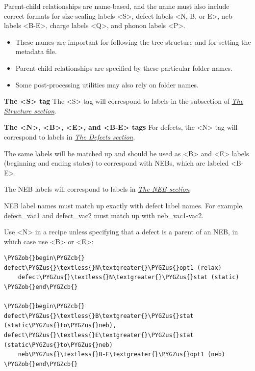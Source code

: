 \documentclass[letterpaper,10pt,english]{sphinxmanual}
\def\PYGZus{\char`\_}
\def\PYGZob{\char`\{}
\def\PYGZcb{\char`\}}
\begin{document}
Parent-child relationships are name-based, and the name must also include correct formats for size-scaling labels \textless{}S\textgreater{}, defect labels \textless{}N, B, or E\textgreater{}, neb labels \textless{}B-E\textgreater{}, charge labels \textless{}Q\textgreater{}, and phonon labels \textless{}P\textgreater{}.
\begin{itemize}
\item {} 
These names are important for following the tree structure and for setting the metadata file.

\item {} 
Parent-child relationships are specified by these particular folder names.

\item {} 
Some post-processing utilities may also rely on folder names.

\end{itemize}

\textbf{The \textless{}S\textgreater{} tag}
The \textless{}S\textgreater{} tag will correspond to labels in the  subsection of {\hyperref[3_1_1_structure::doc]{\emph{The Structure section}}}.

\textbf{The \textless{}N\textgreater{}, \textless{}B\textgreater{}, \textless{}E\textgreater{}, and \textless{}B-E\textgreater{} tags}
For defects, the \textless{}N\textgreater{} tag will correspond to labels in {\hyperref[3_1_5_defects::doc]{\emph{The Defects section}}}.

The same labels will be matched up and should be used as \textless{}B\textgreater{} and \textless{}E\textgreater{} labels (beginning and ending states) to correspond with NEBs, which are labeled \textless{}B-E\textgreater{}.

The NEB labels will correspond to labels in {\hyperref[3_1_6_neb::doc]{\emph{The NEB section}}}

NEB label names must match up exactly with defect label names. For example, defect\_vac1 and defect\_vac2 must match up with neb\_vac1-vac2.

Use \textless{}N\textgreater{} in a recipe unless specifying that a defect is a parent of an NEB, in which case use \textless{}B\textgreater{} or \textless{}E\textgreater{}:

\begin{Verbatim}[commandchars=\\\{\}]
\PYGZob{}begin\PYGZcb{}
defect\PYGZus{}\textless{}N\textgreater{}\PYGZus{}opt1 (relax)
    defect\PYGZus{}\textless{}N\textgreater{}\PYGZus{}stat (static)
\PYGZob{}end\PYGZcb{}

\PYGZob{}begin\PYGZcb{}
defect\PYGZus{}\textless{}B\textgreater{}\PYGZus{}stat (static\PYGZus{}to\PYGZus{}neb), defect\PYGZus{}\textless{}E\textgreater{}\PYGZus{}stat (static\PYGZus{}to\PYGZus{}neb)
    neb\PYGZus{}\textless{}B-E\textgreater{}\PYGZus{}opt1 (neb)
\PYGZob{}end\PYGZcb{}
\end{Verbatim}
\end{document}
